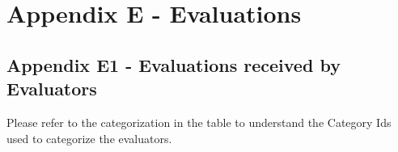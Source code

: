 \chapter{Appendix E - Evaluations}
\label{appendix:evaluation}

\section*{Appendix E1 - Evaluations received by Evaluators}

Please refer to the categorization in the table \textit{\textbf{}} to understand the Category Ids used to categorize the evaluators.

\vspace{-4mm}
